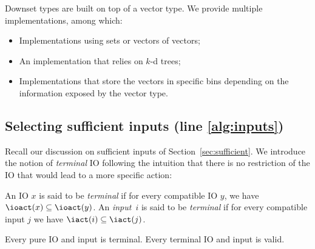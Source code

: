 \documentclass[runningheads,a4paper,draft]{llncs}
\begin{document}
Downset types are built on top of a vector type.  We provide multiple
implementations, among which:
\begin{itemize}
\item Implementations using sets or vectors of vectors;
\item An implementation that relies on \(k\)-d trees;
\item Implementations that store the vectors in specific bins depending on the
  information exposed by the vector type.
\end{itemize}

\subsection{Selecting sufficient inputs (line \ref{alg:inputs})}


Recall our discussion on sufficient inputs of Section~\ref{sec:sufficient}.  We
introduce the notion of \emph{terminal} IO following
the intuition that there
is
no restriction of the IO that would lead to a more specific action:
\begin{definition}
  An IO \(x\) is said to be \emph{terminal} if for every compatible IO \(y\), we
  have \(\ioact(x) \subseteq \ioact(y)\).  %
  An \emph{input}~\(i\) is said to be
  \emph{terminal} if for every compatible input \(j\) we have
  \(\iact(i) \subseteq \iact(j)\).
\end{definition}

\begin{proposition}
  Every pure IO and input is terminal.  Every terminal IO and input is valid.
\end{proposition}
\end{document}
